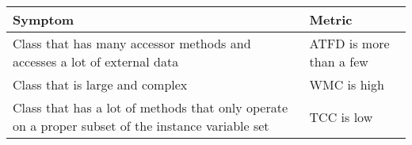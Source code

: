 \documentclass[12pt,a4paper]{article}
\begin{document}
    \begin{tabularx}{\textwidth}{|X|X|}
        \hline
        \textbf{Symptom} & \textbf{Metric} \\
        \hline
        Class that has many accessor methods and accesses a lot of external data & ATFD is more than a few\\
        \hline
        Class that is large and complex & WMC is high\\
        \hline
        Class that has a lot of methods that only operate on a proper subset of the instance variable set & TCC is low\\
        \hline
    \end{tabularx}
\end{document}
